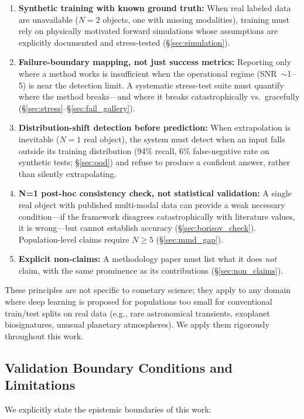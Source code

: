\documentclass[usenatbib]{mnras}
\begin{document}
\begin{enumerate}
    \item \textbf{Synthetic training with known ground truth:} When real labeled data are unavailable ($N=2$ objects, one with missing modalities), training must rely on physically motivated forward simulations whose assumptions are explicitly documented and stress-tested (\S\ref{sec:simulation}).
    \item \textbf{Failure-boundary mapping, not just success metrics:} Reporting only where a method works is insufficient when the operational regime (SNR~$\sim$1--5) is near the detection limit. A systematic stress-test suite must quantify where the method breaks---and where it breaks catastrophically vs.\ gracefully (\S\ref{sec:stress}--\S\ref{sec:fail_gallery}).
    \item \textbf{Distribution-shift detection before prediction:} When extrapolation is inevitable ($N=1$ real object), the system must detect when an input falls outside its training distribution (94\% recall, 6\% false-negative rate on synthetic tests; \S\ref{sec:ood}) and refuse to produce a confident answer, rather than silently extrapolating.
    \item \textbf{N=1 post-hoc consistency check, not statistical validation:} A single real object with published multi-modal data can provide a weak necessary condition---if the framework disagrees catastrophically with literature values, it is wrong---but cannot establish accuracy (\S\ref{sec:borisov_check}). Population-level claims require $N \geq 5$ (\S\ref{sec:mmd_gap}).
    \item \textbf{Explicit non-claims:} A methodology paper must list what it does \textit{not} claim, with the same prominence as its contributions (\S\ref{sec:non_claims}).
\end{enumerate}

These principles are not specific to cometary science; they apply to any domain where deep learning is proposed for populations too small for conventional train/test splits on real data (e.g., rare astronomical transients, exoplanet biosignatures, unusual planetary atmospheres). We apply them rigorously throughout this work.

\subsection{Validation Boundary Conditions and Limitations}\label{sec:boundaries}

We explicitly state the epistemic boundaries of this work:
\end{document}
